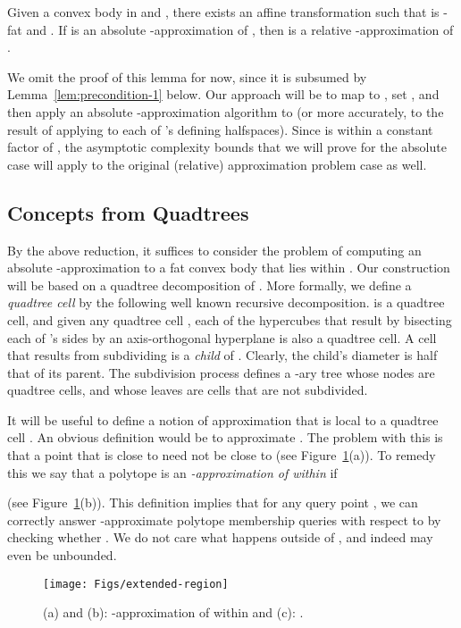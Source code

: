 \documentclass[11pt]{article}   \usepackage[letterpaper,hmargin=2.1cm,vmargin=3cm]{geometry}
\begin{document}
\begin{lemma} \label{lem:fat}
Given a convex body  in  and , there exists an affine transformation  such that  is -fat and . If  is an absolute -approximation of , then  is a relative -approximation of .
\end{lemma}


We omit the proof of this lemma for now, since it is subsumed by Lemma~\ref{lem:precondition-1} below. Our approach will be to map  to , set , and then apply an absolute -approximation algorithm to  (or more accurately, to the result of applying  to each of 's defining halfspaces). Since  is within a constant factor of , the asymptotic complexity bounds that we will prove for the absolute case will apply to the original (relative) approximation problem case as well.


\subsection{Concepts from Quadtrees} \label{sec:prelim-quadtree}


By the above reduction, it suffices to consider the problem of computing an absolute -approxi\-mation to a fat convex body  that lies within . Our construction will be based on a quadtree decomposition of . More formally, we define a \emph{quadtree cell} by the following well known recursive decomposition.  is a quadtree cell, and given any quadtree cell , each of the  hypercubes that result by bisecting each of 's sides by an axis-orthogonal hyperplane is also a quadtree cell. A cell  that results from subdividing  is a \emph{child} of . Clearly, the child's diameter is half that of its parent. The subdivision process defines a -ary tree whose nodes are quadtree cells, and whose leaves are cells that are not subdivided.

It will be useful to define a notion of approximation that is local to a quadtree cell . An obvious definition would be to approximate . The problem with this is that a point  that is close to  need not be close to  (see Figure~\ref{fig:extended-region}(a)). To remedy this we say that a polytope  is an \emph{-approximation of  within}  if

(see Figure~\ref{fig:extended-region}(b)). This definition implies that for any query point , we can correctly answer -approximate polytope membership queries with respect to  by checking whether . We do not care what happens outside of , and indeed  may even be unbounded.

\begin{figure}[htbp]
  \centerline{\texttt{[image: Figs/extended-region]}}
  \caption{(a) and (b): -approximation of  within  and (c): .}
  \label{fig:extended-region}
\end{figure}
\end{document}
